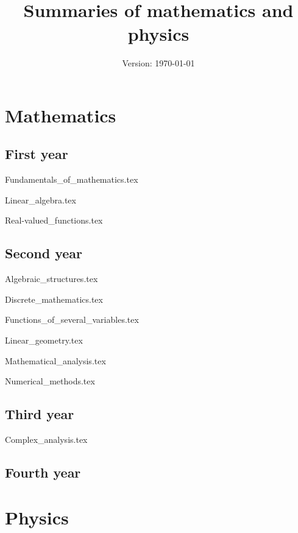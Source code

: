 \documentclass{report}
\title{Summaries of mathematics and physics}
\date{Version: \today}
\begin{document}
\maketitle
\newpage
\tableofcontents
\newpage
\part{Mathematics}
    \chapter{First year}
        {Fundamentals_of_mathematics.tex}
        \cleardoublepage    
    
        {Linear_algebra.tex}
        \cleardoublepage
        
        {Real-valued_functions.tex}
        \cleardoublepage
    \chapter{Second year}
        {Algebraic_structures.tex}
        \cleardoublepage
        
        {Discrete_mathematics.tex}
        \cleardoublepage
        
        {Functions_of_several_variables.tex}
        \cleardoublepage
        
        {Linear_geometry.tex}
        \cleardoublepage
        
        {Mathematical_analysis.tex}
        \cleardoublepage
        
        {Numerical_methods.tex}
        \cleardoublepage
    \chapter{Third year}
        {Complex_analysis.tex}
        \cleardoublepage
    \chapter{Fourth year}
\part{Physics}
\end{document}
